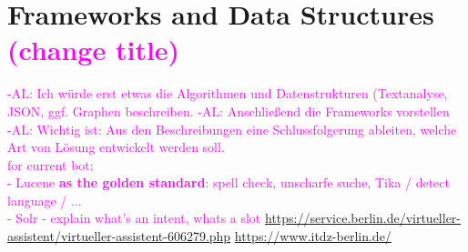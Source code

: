 \section{Frameworks and Data Structures \textcolor{magenta}{(change title)}}

\textcolor{magenta}{-AL: Ich w\"urde erst etwas die Algorithmen und Datenstrukturen (Textanalyse, JSON, ggf. Graphen beschreiben. 
	-AL: Anschlie{\ss}end die Frameworks vorstellen\\ 
	-AL: Wichtig ist: Aus den Beschreibungen eine Schlussfolgerung ableiten, welche Art von L\"osung entwickelt werden soll.\\
for current bot: \\
- Lucene \textbf{as the golden standard}: spell check, unscharfe suche, Tika / detect language / ... \\
- Solr
- explain what's an intent, whats a slot
\url{https://service.berlin.de/virtueller-assistent/virtueller-assistent-606279.php}
\url{https://www.itdz-berlin.de/}
}


